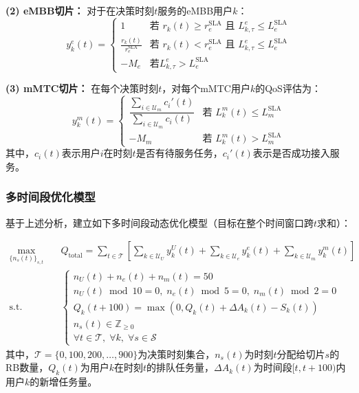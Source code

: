 \textbf{(2) eMBB切片：}
对于在决策时刻$t$服务的eMBB用户$k$：
\begin{equation}
y_{k}^{e}(t) = \begin{cases}
1 & \text{若 } r_k(t) \geq r_{e}^{\text{SLA}} \text{ 且 } L_{k,\tau}^{e} \leq L_{e}^{\text{SLA}} \\
\frac{r_k(t)}{r_{e}^{\text{SLA}}} & \text{若 } r_k(t) < r_{e}^{\text{SLA}} \text{ 且 } L_{k,\tau}^{e} \leq L_{e}^{\text{SLA}} \\
-M_{e} & \text{若} L_{k,\tau}^{e} > L_{e}^{\text{SLA}}
\end{cases}
\end{equation}

\textbf{(3) mMTC切片：}
在每个决策时刻$t$，对每个mMTC用户$k$的QoS评估为：
\begin{equation}
y_k^{m}(t) = \begin{cases}
\dfrac{\sum_{i \in \mathcal{U}_{m}} c_i'(t)}{\sum_{i \in \mathcal{U}_{m}} c_i(t)} & \text{若 } L_k^{m}(t) \le L_{m}^{\text{SLA}} \\
-M_{m} & \text{若 } L_k^{m}(t) > L_{m}^{\text{SLA}}
\end{cases}
\end{equation}
其中，$c_i(t)$表示用户$i$在时刻$t$是否有待服务任务，$c_i'(t)$表示是否成功接入服务。

\subsubsection{多时间段优化模型}
 
基于上述分析，建立如下多时间段动态优化模型（目标在整个时间窗口跨$t$求和）：

\begin{equation}
\begin{aligned}
\max_{\{n_s(t)\}_{s,t}} \quad & Q_{\text{total}} = \sum_{t \in \mathcal{T}} \left[ \sum_{k \in \mathcal{U}_U} y_{k}^{U}(t) + \sum_{k \in \mathcal{U}_e} y_{k}^{e}(t) + \sum_{k \in \mathcal{U}_m} y_{k}^{m}(t) \right]\\
\text{s.t.} \quad & \begin{cases}
 n_U(t) + n_e(t) + n_m(t) = 50\\
 n_U(t) \bmod 10 = 0,\; n_e(t) \bmod 5 = 0,\; n_m(t) \bmod 2 = 0\\
 Q_k(t+100) = \max\!\left(0, Q_k(t) + \Delta A_k(t) - S_k(t)\right) \\
 n_s(t) \in \mathbb{Z}_{\ge 0}\\
 \forall t \in \mathcal{T},\; \forall k,\; \forall s \in \mathcal{S}
 \end{cases}
 \end{aligned}
 \end{equation}
其中，$\mathcal{T} = \{0, 100, 200, \ldots, 900\}$为决策时刻集合，$n_s(t)$为时刻$t$分配给切片$s$的RB数量，$Q_k(t)$为用户$k$在时刻$t$的排队任务量，$\Delta A_k(t)$为时间段$[t, t+100)$内用户$k$的新增任务量。

